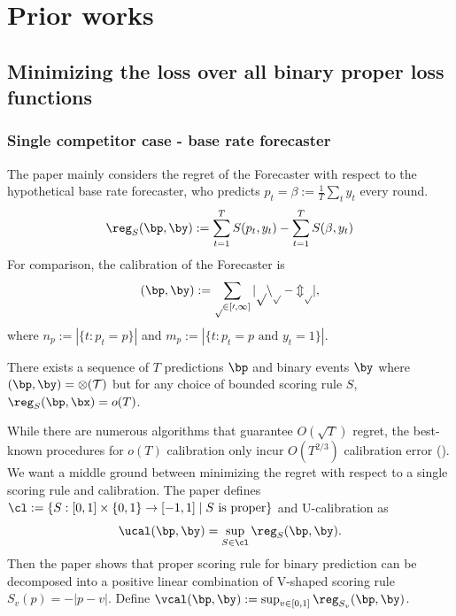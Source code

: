 \section{Prior works}\label{sec:prior_works}
\subsection{Minimizing the loss over all binary proper loss functions}

\subsubsection{Single competitor case - base rate forecaster}
The paper mainly considers the regret of the Forecaster with respect to the hypothetical base rate forecaster, who predicts $p_t=\beta:=\frac{1}{T}\sum_t y_t$ every round.
\[
\reg_S(\bp, \by) := \sum_{t=1}^T S(p_t, y_t) - \sum_{t=1}^T S(\beta, y_t)
\]
For comparison, the calibration of the Forecaster is 
\[
\cal(\bp,\by) := \sum_{p \in [0,1]} |pn_p - m_p|, 
\]
where $n_p :=|\{t: p_t=p\}|$ and $m_p := |\{t: p_t=p \text{ and } y_t=1\}|$.

\begin{lemma}
    There exists a sequence of $T$ predictions $\bp$ and binary events $\by$ where $\cal(\bp, \by) = \Omega(T)$ but for any choice of bounded scoring rule $S$, $\reg_S(\bp, \bx)=o(T)$.
\end{lemma}
While there are numerous algorithms that guarantee $O(\sqrt{T})$ regret, the best-known procedures for $o(T)$ calibration only incur $O(T^{2/3})$ calibration error (\cite{blum2007calibration}).
We want a middle ground between minimizing the regret with respect to a single scoring rule and calibration. The paper defines $\cl := \{S:[0,1]\times \{0,1\} \to [-1,1] \mid S \text{ is proper}\}$ and U-calibration as
\[
\ucal(\bp, \by) = \sup_{S \in \cl} \reg_S (\bp, \by).
\]
Then the paper shows that proper scoring rule for binary prediction can be decomposed into a positive linear combination of V-shaped scoring rule $S_v(p) = -|p-v|$. Define $\vcal(\bp,\by) := \sup_{v\in[0,1]} \reg_{S_v}(\bp,\by)$. 

